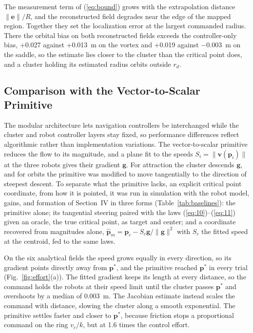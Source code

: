 \documentclass[lettersize,journal]{IEEEtran}
\newcommand{\rev}[1]{#1}
\begin{document}
The measurement term of (\ref{eq:bound}) grows with the extrapolation distance $\|\mathbf{e}\|/R$, and the reconstructed field degrades near the edge of the mapped region. Together they set the localization error at the largest commanded radius. There the orbital bias on both reconstructed fields exceeds the controller-only bias, \rev{+0.027} against \rev{+0.013}~m on the vortex and \rev{+0.019} against \rev{$-$0.003}~m on the saddle, so the estimate lies closer to the cluster than the critical point does, and a cluster holding its estimated radius orbits outside $r_d$.

\subsection{Comparison with the Vector-to-Scalar Primitive}

The modular architecture lets navigation controllers be interchanged while the cluster and robot controller layers stay fixed, so performance differences reflect algorithmic rather than implementation variations.
The vector-to-scalar primitive \cite{48} reduces the flow to its magnitude, and a plane fit to the speeds $S_i = \|\mathbf{v}(\mathbf{p}_i)\|$ at the three robots gives their gradient $\mathbf{g}$. For attraction the cluster descends $\mathbf{g}$, and for orbits the primitive was modified to move tangentially to the direction of steepest descent. To separate what the primitive lacks, an explicit critical point coordinate, from how it is pointed, it was run in simulation with the robot model, gains, and formation of Section~IV in three forms (Table~\ref{tab:baselines}): the primitive alone; its tangential steering paired with the laws (\ref{eq:10})--(\ref{eq:11}) given an oracle, the true critical point, as target and center; and a coordinate recovered from magnitudes alone, $\hat{\mathbf{p}}_m = \mathbf{p}_c - S_c\mathbf{g}/\|\mathbf{g}\|^2$ with $S_c$ the fitted speed at the centroid, fed to the same laws.

On the six analytical fields the speed grows equally in every direction, so its gradient points directly away from $\mathbf{p}^*$, and the primitive reached $\mathbf{p}^*$ in every trial (Fig.~\ref{fig:effort}(a)). The fitted gradient keeps its length at every distance, so the command holds the robots at their speed limit until the cluster passes $\mathbf{p}^*$ and overshoots by a median of \rev{0.003}~m. The Jacobian estimate instead scales the command with distance, slowing the cluster along a smooth exponential. The primitive settles faster and closer to $\mathbf{p}^*$, because friction stops a proportional command on the ring $v_c/k$, but at \rev{1.6} times the control effort.
\end{document}
